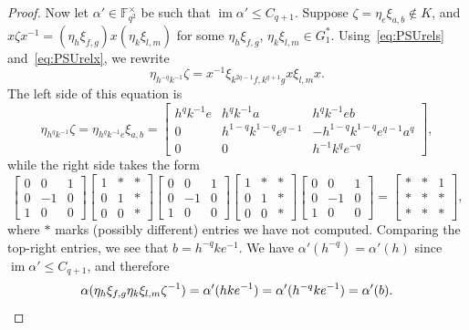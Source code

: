 \begin{proof}
Now let $\alpha' \in \mathbb{F}_{q^2}^\times$ be such that $\operatorname{im} \alpha' \leq C_{q+1}$.
Suppose $\zeta = \eta_e \xi_{a,b} \notin K$, and $x\zeta x^{-1} = (\eta_{h} \xi_{f,g} ) x (\eta_{k} \xi_{l,m})$ for some $\eta_h \xi_{f,g}$, $\eta_k \xi_{l,m} \in G_1^*$.
Using~\eqref{eq:PSUrels} and~\eqref{eq:PSUrelx}, we rewrite
\[
\eta_{h^{-q} k^{-1}} \zeta
=
x^{-1} \xi_{k^{2q-1} f, k^{q+1} g} x \xi_{l,m} x.
\]
The left side of this equation is
\[ \eta_{h^q k^{-1}} \zeta 
=
\eta_{h^q k^{-1} e} \xi_{a,b}
=
\begin{bmatrix}
h^q k^{-1} e & h^q k^{-1} a & h^q k^{-1} e b \\
0 & h^{1-q} k^{1-q} e^{q-1} & -h^{1-q} k^{1-q} e^{q-1} a^q \\
0 & 0 & h^{-1} k^q e^{-q}
\end{bmatrix},
\]
while the right side takes the form
\[
\begin{bmatrix} 0 & 0 & 1 \\ 0 & -1 & 0 \\ 1 & 0 & 0 \end{bmatrix}
\begin{bmatrix} 1 & \ast & \ast \\ 0 & 1 & \ast \\ 0 & 0 & \ast \end{bmatrix}
\begin{bmatrix} 0 & 0 & 1 \\ 0 & -1 & 0 \\ 1 & 0 & 0 \end{bmatrix}
\begin{bmatrix} 1 & \ast & \ast \\ 0 & 1 & \ast \\ 0 & 0 & \ast \end{bmatrix}
\begin{bmatrix} 0 & 0 & 1 \\ 0 & -1 & 0 \\ 1 & 0 & 0 \end{bmatrix}
=
\begin{bmatrix} \ast & \ast & 1 \\ \ast & \ast & \ast \\ \ast & \ast & \ast \end{bmatrix},
\]
where $\ast$ marks (possibly different) entries we have not computed.
Comparing the top-right entries, we see that
$b = h^{-q} k e^{-1}$.
We have $\alpha'(h^{-q}) = \alpha'(h)$ since $\operatorname{im} \alpha' \leq C_{q+1}$, and therefore
\[ \alpha( \eta_h \xi_{f,g} \eta_k \xi_{l,m} \zeta^{-1} ) = \alpha'(hke^{-1}) = \alpha'(h^{-q} k e^{-1}) = \alpha'(b). \qedhere \]
\end{proof}


